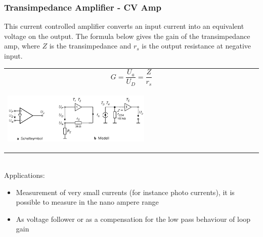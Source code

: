 		\subsubsection{Transimpedance Amplifier - CV Amp}
			This current controlled amplifier converts an input current into an equivalent voltage on the output. The formula below gives the gain of the transimpedance amp, where $Z$ is the transimpedance and $r_s$ is the output resistance at negative input.  
			\begin{table}[h!]
				\centering
				\begin{tabular}{m{}}
					
					\begin{equation}
						G = \frac{U_a}{U_D} = \frac{Z}{r_s}
					\end{equation}	

				\\
							
					\begin{center}\includegraphics[width=0.55\textwidth]{images/TransimpedanceOPAMPModell.png}\end{center} 
				\\
			
				\end{tabular}
			\end{table}
			\\
			Applications: \\
			\begin{itemize}
				\setlength{\itemsep}{-4pt}
				\item Measurement of very small currents (for instance photo currents), it is possible to measure in the nano ampere range
				\item As voltage follower or as a compensation for the low pass behaviour of loop gain
			\end{itemize}
			
